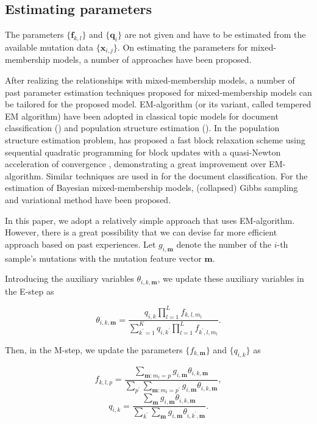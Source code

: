 \subsection*{Estimating parameters}

The parameters $\{ \bm{f}_{k, l} \}$ and $\{ \bm{q}_i \}$
are not given and have to be estimated from the available mutation data $\{ \bm{x}_{i,j} \}$.
On estimating the parameters for mixed-membership models, a number of approaches have been proposed.

After realizing the relationships with mixed-membership models, 
a number of  past parameter estimation techniques proposed for mixed-membership models can be tailored for the proposed model.
EM-algorithm (or its variant, called tempered EM algorithm) have been adopted in classical topic models 
for document classification (\cite{Hofmann:1999}) and population structure estimation (\cite{tang2005estimation}).
In the population structure estimation problem, \cite{pmid19648217} has proposed 
a fast block relaxation scheme using sequential quadratic programming for block updates
with a quasi-Newton acceleration of convergence \cite{zhou2011quasi}, demonstrating a great improvement over EM-algorithm.
Similar techniques are used in \cite{taddy2011estimation} for the document classification.
For the estimation of Bayesian mixed-membership models, 
(collapsed) Gibbs sampling \cite{pmid10835412,pmid14872004} and 
variational method \cite{Blei:2003,teh2006collapsed,raj2014variational} have been proposed. 

In this paper, we adopt a relatively simple approach that uses EM-algorithm.
However, there is a great possibility that we can devise far more efficient approach based on past experiences.
Let $g_{i, \bm{m}}$ denote the number of the $i$-th sample's mutations with the mutation feature vector $\bm{m}$.

Introducing the auxiliary variables $\theta_{i, k, \bm{m}}$, 
we update these auxiliary variables in the E-step as

\begin{equation*}
\theta_{i, k, \bm{m}} = \frac{  q_{i,k} \prod_{l=1}^L f_{k,l,m_l} }{ \sum_{k^{\prime} = 1}^K q_{i, k^{\prime} } \prod_{l=1}^L f_{k^{\prime}, l, m_l } }.
\end{equation*}

Then, in the M-step, we update the parameters $\{ f_{k, \bm{m} } \}$ and $\{ q_{i, k} \}$ as

\begin{equation*}
f_{k, l, p} = \frac{ \sum_{\bm{m} : m_l = p} g_{i, \bm{m}} \theta_{i, k, \bm{m}} }{ \sum_{p^{\prime} } 
\sum_{\bm{m} : m_l = p^{\prime}}  g_{i, \bm{m}}\theta_{i, k, \bm{m}} },
\end{equation*}
\begin{equation*}
q_{i, k} = \frac{ \sum_{\bm{m}} g_{i, \bm{m}} \theta_{i, k, \bm{m} } }{  \sum_{k^{\prime} }\sum_{\bm{m}} g_{i, \bm{m}} \theta_{i, k^{\prime}, \bm{m} } }.
\end{equation*}

